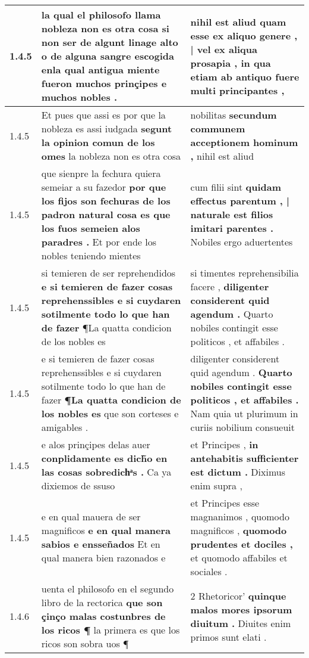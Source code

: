\begin{tabular}{|p{1cm}|p{6.5cm}|p{6.5cm}|}
1.4.5 & la qual el philosofo llama nobleza non es otra cosa \textbf{ si non ser de algunt linage alto o de alguna sangre escogida } enla qual antigua miente fueron muchos prinçipes e muchos nobles . & nihil est aliud quam esse \textbf{ ex aliquo genere , | vel ex aliqua prosapia , } in qua etiam ab antiquo fuere multi principantes , \\\hline
1.4.5 & Et pues que assi es por que la nobleza es assi iudgada \textbf{ segunt la opinion comun de los omes } la nobleza non es otra cosa & nobilitas \textbf{ secundum communem acceptionem hominum , } nihil est aliud \\\hline
1.4.5 & que sienpre la fechura quiera semeiar a su fazedor \textbf{ por que los fijos son fechuras de los padron natural cosa es que los fuos semeien alos paradres . } Et por ende los nobles teniendo mientes & cum filii sint \textbf{ quidam effectus parentum , | naturale est filios imitari parentes . } Nobiles ergo aduertentes \\\hline
1.4.5 & si temieren de ser reprehendidos \textbf{ e si temieren de fazer cosas reprehenssibles e si cuydaren sotilmente todo lo que han de fazer } ¶La quatta condicion de los nobles es & si timentes reprehensibilia facere , \textbf{ diligenter considerent quid agendum . } Quarto nobiles contingit esse politicos , et affabiles . \\\hline
1.4.5 & e si temieren de fazer cosas reprehenssibles e si cuydaren sotilmente todo lo que han de fazer \textbf{ ¶La quatta condicion de los nobles es } que son corteses e amigables . & diligenter considerent quid agendum . \textbf{ Quarto nobiles contingit esse politicos , et affabiles . } Nam quia ut plurimum in curiis nobilium consueuit \\\hline
1.4.5 & e alos prinçipes delas auer \textbf{ conplidamente es dich̃o en las cosas sobredichͣs . } Ca ya dixiemos de ssuso & et Principes , \textbf{ in antehabitis sufficienter est dictum . } Diximus enim supra , \\\hline
1.4.5 & e en qual mauera de ser magnificos \textbf{ e en qual manera sabios e ensseñados } Et en qual manera bien razonados e & et Principes esse magnanimos , quomodo magnificos , \textbf{ quomodo prudentes et dociles , } et quomodo affabiles et sociales . \\\hline
1.4.6 & uenta el philosofo en el segundo libro de la rectorica \textbf{ que son çinço malas costunbres de los ricos ¶ } la primera es que los ricos son sobra uos ¶ & 2 Rhetoricor’ \textbf{ quinque malos mores ipsorum diuitum . } Diuites enim primos sunt elati . \\\hline

\end{tabular}

